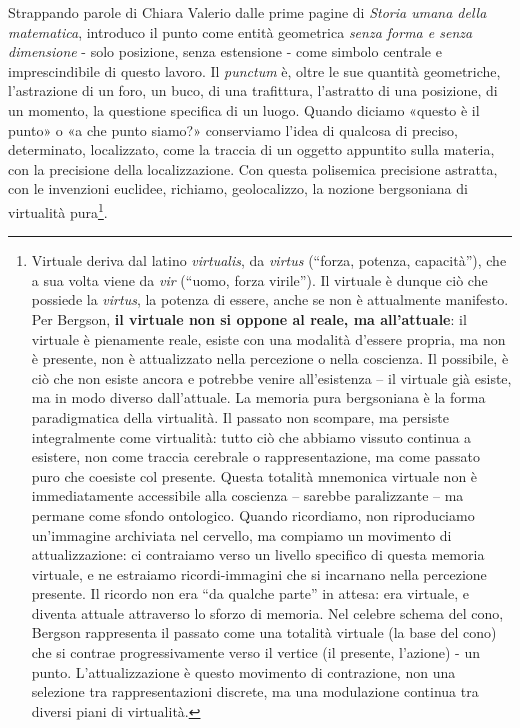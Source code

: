 Strappando parole di Chiara Valerio dalle prime pagine di \emph{Storia umana della matematica}, introduco il punto come entità geometrica \emph{senza forma e senza dimensione} - solo posizione, senza estensione - come simbolo centrale e imprescindibile di questo lavoro. Il \emph{punctum} è, oltre le sue quantità geometriche, l'astrazione di un foro, un buco, di una trafittura, l'astratto di una posizione, di un momento, la questione specifica di un luogo. Quando diciamo «questo è il punto» o «a che punto siamo?» conserviamo l'idea di qualcosa di preciso, determinato, localizzato, come la traccia di un oggetto appuntito sulla materia, con la precisione della localizzazione. Con questa polisemica precisione astratta, con le invenzioni euclidee, richiamo, geolocalizzo, la nozione bergsoniana di virtualità pura\footnote{%
  Virtuale deriva dal latino \emph{virtualis}, da \emph{virtus} (“forza, potenza, capacità”), che a sua volta viene da \emph{vir} (“uomo, forza virile”). Il virtuale è dunque ciò che possiede la \emph{virtus}, la potenza di essere, anche se non è attualmente manifesto. Per Bergson, \textbf{il virtuale non si oppone al reale, ma all'attuale}: il virtuale è pienamente reale, esiste con una modalità d'essere propria, ma non è presente, non è attualizzato nella percezione o nella coscienza. Il possibile, è ciò che non esiste ancora e potrebbe venire all'esistenza – il virtuale già esiste, ma in modo diverso dall'attuale. La memoria pura bergsoniana è la forma paradigmatica della virtualità. Il passato non scompare, ma persiste integralmente come virtualità: tutto ciò che abbiamo vissuto continua a esistere, non come traccia cerebrale o rappresentazione, ma come passato puro che coesiste col presente. Questa totalità mnemonica virtuale non è immediatamente accessibile alla coscienza – sarebbe paralizzante – ma permane come sfondo ontologico. Quando ricordiamo, non riproduciamo un'immagine archiviata nel cervello, ma compiamo un movimento di attualizzazione: ci contraiamo verso un livello specifico di questa memoria virtuale, e ne estraiamo ricordi-immagini che si incarnano nella percezione presente. Il ricordo non era “da qualche parte” in attesa: era virtuale, e diventa attuale attraverso lo sforzo di memoria. Nel celebre schema del cono, Bergson rappresenta il passato come una totalità virtuale (la base del cono) che si contrae progressivamente verso il vertice (il presente, l'azione) - un punto. L'attualizzazione è questo movimento di contrazione, non una selezione tra rappresentazioni discrete, ma una modulazione continua tra diversi piani di virtualità.
}.

